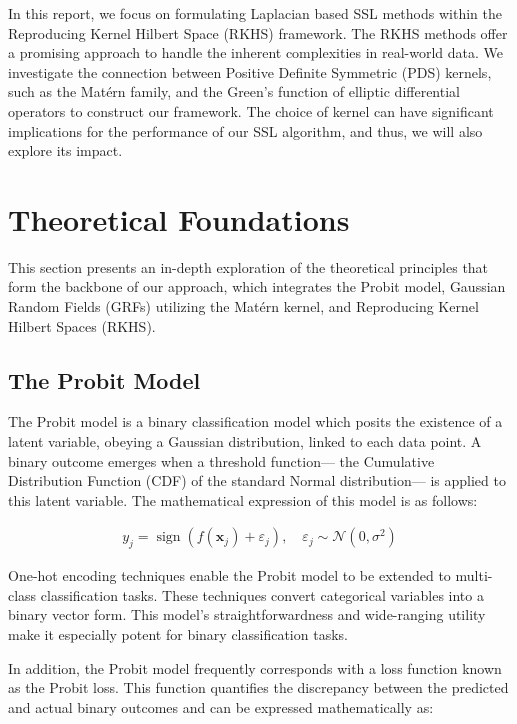 \documentclass[11pt]{amsart}
\begin{document}
In this report, we focus on formulating Laplacian based SSL methods within the Reproducing Kernel Hilbert Space (RKHS) framework. The RKHS methods offer a promising approach to handle the inherent complexities in real-world data. We investigate the connection between Positive Definite Symmetric (PDS) kernels, such as the Matérn family, and the Green’s function of elliptic differential operators to construct our framework. The choice of kernel can have significant implications for the performance of our SSL algorithm, and thus, we will also explore its impact.

\section{Theoretical Foundations}\label{sec:theory}

This section presents an in-depth exploration of the theoretical principles that form the backbone of our approach, which integrates the Probit model, Gaussian Random Fields (GRFs) utilizing the Matérn kernel, and Reproducing Kernel Hilbert Spaces (RKHS).

\subsection{The Probit Model}\label{sec:probit_model}

The Probit model is a binary classification model which posits the existence of a latent variable, obeying a Gaussian distribution, linked to each data point. \cite{hoffman2020} A binary outcome emerges when a threshold function— the Cumulative Distribution Function (CDF) of the standard Normal distribution— is applied to this latent variable. The mathematical expression of this model is as follows:

\begin{align*}
y_j = \operatorname{sign} (f(\mathbf x_j) + \varepsilon_j), \quad \varepsilon_j \sim \mathcal N(0, \sigma^2)
\end{align*}

One-hot encoding techniques enable the Probit model to be extended to multi-class classification tasks. These techniques convert categorical variables into a binary vector form. This model's straightforwardness and wide-ranging utility make it especially potent for binary classification tasks.

In addition, the Probit model frequently corresponds with a loss function known as the Probit loss. This function quantifies the discrepancy between the predicted and actual binary outcomes and can be expressed mathematically as:
\end{document}
